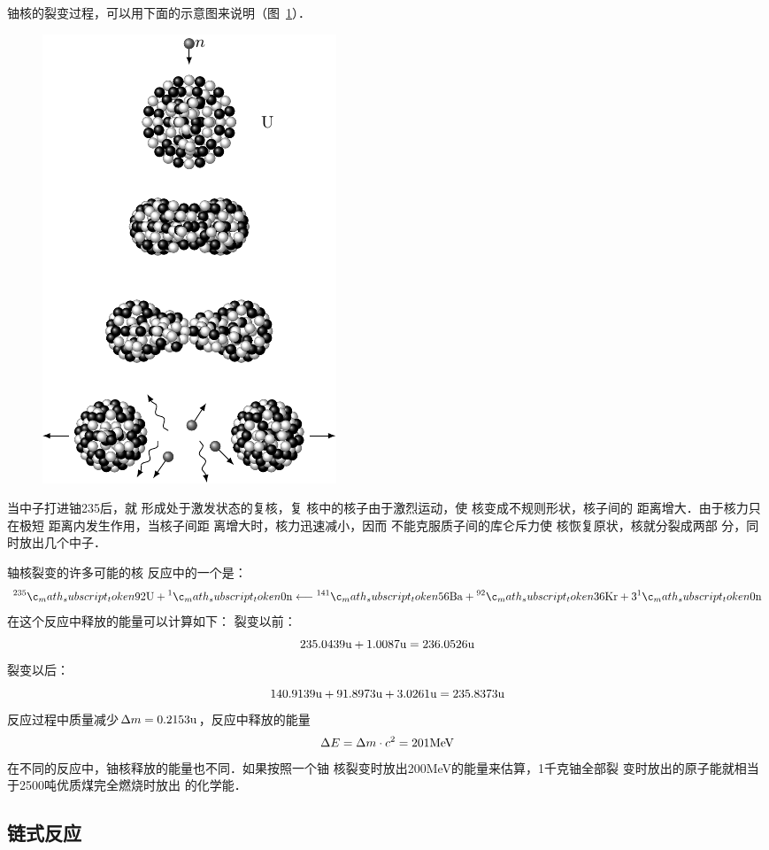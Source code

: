 铀核的裂变过程，可以用下面的示意图来说明（图~\ref{fig_C_9-12}）．
\begin{figure}[htbp]
    \centering
    \includegraphics{fig/C/9-12.pdf}
    \caption{}\label{fig_C_9-12}
\end{figure}

当中子打进铀235后，就
形成处于激发状态的复核，复
核中的核子由于激烈运动，使
核变成不规则形状，核子间的
距离增大．由于核力只在极短
距离内发生作用，当核子间距
离增大时，核力迅速减小，因而
不能克服质子间的库仑斥力使
核恢复原状，核就分裂成两部
分，同时放出几个中子．

轴核裂变的许多可能的核
反应中的一个是：
\[\atom{U}{235}{92}+\atom{n}{1}{0}\longleftarrow \atom{Ba}{141}{56}+\atom{Kr}{92}{36}+3\atom{n}{1}{0}\]
在这个反应中释放的能量可以计算如下：
裂变以前：
\[235.0439{\rm u}+1.0087{\rm u}=236.0526{\rm u} \]
裂变以后：
\[140.9139{\rm u}+91.8973{\rm u}+3.0261{\rm u}=235.8373{\rm u} \]
反应过程中质量减少$\Delta m=0.2153{\rm u}$，反应中释放的能量
\[\Delta E=\Delta m\cdot c^2=201{\rm MeV}\]
在不同的反应中，铀核释放的能量也不同．如果按照一个铀
核裂变时放出200MeV的能量来估算，1千克铀全部裂
变时放出的原子能就相当于2500吨优质煤完全燃烧时放出
的化学能．

\subsection{链式反应} 

